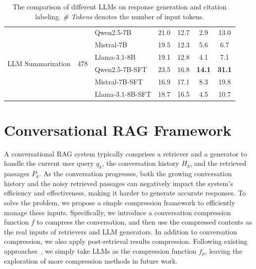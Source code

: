 \documentclass[11pt]{article}
\begin{document}
\begin{table}[tbp]
\begin{tabular}{@{}p{2.8cm}p{1.5cm}lcccc@{}}
        \midrule
        \multirow{6}{4cm}{LLM Summarization} & \multirow{6}{*}{478} 
        &Qwen2.5-7B & 21.0 & 12.7 & 2.9 & 13.0 \\
        &&Mistral-7B & 19.5 & 12.3 & 5.6 & 6.7 \\
        &&Llama-3.1-8B & 19.1 & 12.8 & 4.1 & 7.1 \\

        
        \cmidrule(lr){3-7}
        &&Qwen2.5-7B-SFT & 23.5&16.8& \textbf{14.1} & \textbf{31.1}\\
        &&Mistral-7B-SFT & 16.9 & 17.1 & 8.3 & 19.8 \\
        &&Llama-3.1-8B-SFT & 18.7 & 16.5  & 4.5 & 10.7 \\
        
        \bottomrule
    \end{tabular}
    \caption{The comparison of different LLMs on response generation and citation labeling. \textit{\# Tokens} denotes the number of input tokens. }
    \label{generation_performances}
\end{table}






















\section{Conversational RAG Framework}
\label{sec:conversation_compression}
A conversational RAG system typically comprises a retriever and a generator to handle the current user query $q_k$, the conversation history $H_k$, and the retrieved passages $P_k$. As the conversation progresses, both the growing conversation history and the noisy retrieved passages can negatively impact the system's efficiency and effectiveness, making it harder to generate accurate responses. To solve the problem, we propose a simple compression framework to efficiently manage these inputs.
Specifically, we introduce a conversation compression function $f$ to compress the conversation, and then use the compressed contents as the real inputs of retrievers and LLM generators. In addition to conversation compression, we also apply post-retrieval results compression. Following existing approaches~\cite{xu_recomp}, we simply take LLMs as the compression function $f_{p}$, leaving the exploration of more compression methods in future work.
\end{document}
